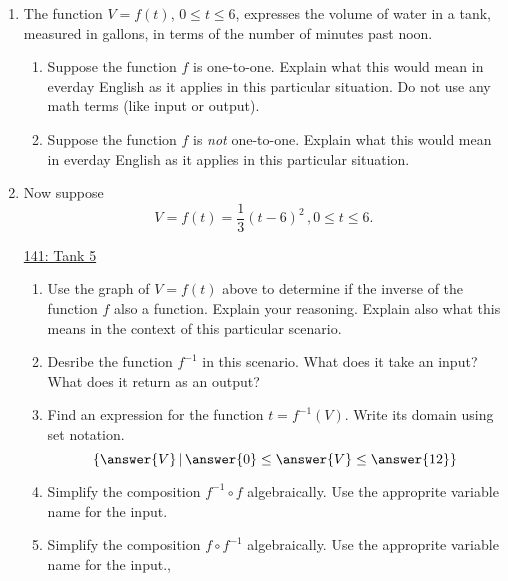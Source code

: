 \documentclass{ximera}
\begin{document}
\begin{example} \label{Ex1:Quadratics}

\begin{enumerate}
\item The function $V=f(t)$, $0\leq t \leq 6$, expresses the volume of water in a tank, measured in gallons, in terms of the number of minutes past noon. 

\begin{enumerate}
\item Suppose the function $f$ is one-to-one. Explain what this would mean in everday English as it applies in this particular situation. Do not use any math terms (like input or output).

\item Suppose the function $f$ is \emph{not} one-to-one. Explain what this would mean in everday English as it applies in this particular situation. %

\end{enumerate}

\item Now suppose 
\[
     V = f(t) = \frac{1}{3}(t-6)^2 \, , 0\leq t \leq 6 .
\]

\begin{onlineOnly}
    \begin{center}
\end{center}
\end{onlineOnly}

\href{https://www.desmos.com/calculator/ef7obzoxx3}{141: Tank 5}

\begin{enumerate}
\item Use the graph of $V=f(t)$ above to determine if the inverse of the function $f$ also a function. Explain your reasoning. Explain also what this means in the context of this particular scenario.

\item Desribe the function $f^{-1}$ in this scenario. What does it take an input? What does it return as an output?

\item Find an expression for the function $t = f^{-1}(V)$. Write its domain using set notation.
\[
      \{ \answer{V} \, | \, \answer{0} \leq \answer{V} \leq \answer{12} \}
\]

\item Simplify the composition $f^{-1}\circ f$ algebraically. Use the approprite variable name for the input.

\item  Simplify the composition $f\circ f^{-1}$ algebraically. Use the approprite variable name for the input.,

\end{enumerate}

\end{enumerate}

\end{example}
\end{document}
